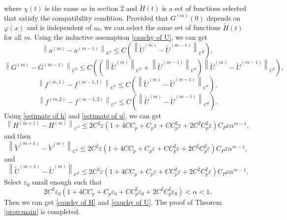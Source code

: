 \documentclass[a4paper,reqno,11pt]{amsart}
\numberwithin{equation}{section} %
\begin{document}
where $\chi (t)$ is the same as in section 2 and $\widetilde{H}(t)$ is a set of functions selected that satisfy the compatibility condition.
Provided that $G^{\left( m \right)}\left( 0 \right)$ depends on $\varphi (x)$ and is independent of $m$, we can select the same set of functions $\widetilde{H}(t)$ for all $m$.
Using the inductive assumption \eqref{cauchy of U}, we can get
$$
\left\| a^{\left( m \right)}-a^{\left( m-1 \right)} \right\| _{C^1}\le C\left( \left\| \tilde{U}^{\left( m \right)}-\tilde{U}^{\left( m-1 \right)} \right\| _{C^2} \right) ,
$$
$$
\left\| G^{\left( m \right)}-G^{\left( m-1 \right)} \right\| _{C^1}\le C\left( \left( \left\| \tilde{U}^{\left( m \right)} \right\| _{C^2}+\left\| \tilde{U}^{\left( m-1 \right)} \right\| _{C^2} \right) \left\| \tilde{U}^{\left( m \right)}-\tilde{U}^{\left( m-1 \right)} \right\| _{C^2} \right) ,
$$
$$
\left\| f^{\left( m,1 \right)}-f^{\left( m-1,1 \right)} \right\| _{C^1}\le C\left( \left\| \tilde{U}^{\left( m \right)}-\tilde{U}^{\left( m-1 \right)} \right\| _{C^2} \right) ,
$$
$$
\left\| f^{\left( m,2 \right)}-f^{\left( m-1,2\right)} \right\| _{C^1}\le C\left( \left\| \tilde{U}^{\left( m \right)}-\tilde{U}^{\left( m-1 \right)} \right\| _{C^2} \right) .
$$
Using \eqref{estimate of h} and \eqref{estimate of u}, we can get
$$
\left\| H^{\left( m+1 \right)}-H^{\left( m \right)} \right\| _{C^1}\le 2C^2\varepsilon \left( 1+4CC_p+C_p\varepsilon +CC_{p}^{2}\varepsilon +2C^2C_{p}^{2}\varepsilon \right)C_P\varepsilon \alpha ^{m-1} ,
$$
and then
$$
\left\| \tilde{V}^{\left( m+1 \right)}-\tilde{V}^{\left( m \right)} \right\| _{C^1}\le 2C^2\varepsilon \left( 1+4CC_p+C_p\varepsilon +CC_{p}^{2}\varepsilon +2C^2C_{p}^{2}\varepsilon \right) C_P\varepsilon \alpha ^{m-1},
$$
and
$$
\left\| \tilde{U}^{\left( m+1 \right)}-\tilde{U}^{\left( m \right)} \right\| _{C^2}\le 2C^2\varepsilon \left( 1+4CC_p+C_p\varepsilon +CC_{p}^{2}\varepsilon +2C^2C_{p}^{2}\varepsilon \right) C_P\varepsilon \alpha ^{m-1}.
$$
Select $\varepsilon _0$ small enough such that
$$
2C^2\varepsilon _0 \left( 1+4CC_p+C_p\varepsilon _0 +CC_{p}^{2}\varepsilon _0 +2C^2C_{p}^{2}\varepsilon _0 \right) <\alpha <1.
$$
Then we can get \eqref{cauchy of H} and \eqref{cauchy of U}. The proof of Theorem \ref{prop:main} is completed.
\end{document}
